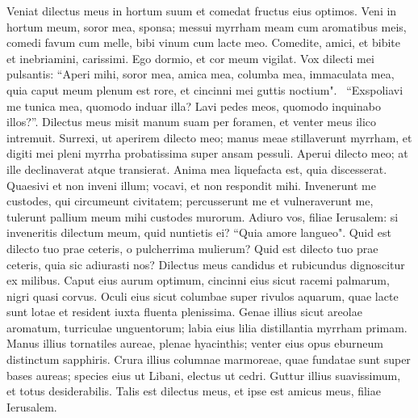 \begin{biblechapter}  
\verse Veniat dilectus meus in hortum suum et comedat fructus eius optimos. Veni in hortum meum, soror mea, sponsa; messui myrrham meam cum aromatibus meis, comedi favum cum melle, bibi vinum cum lacte meo. Comedite, amici, et bibite et inebriamini, carissimi. 
\verse Ego dormio, et cor meum vigilat. Vox dilecti mei pulsantis: “Aperi mihi, soror mea, amica mea, columba mea, immaculata mea, quia caput meum plenum est rore, et cincinni mei guttis noctium".  
\verse “Exspoliavi me tunica mea, quomodo induar illa? Lavi pedes meos, quomodo inquinabo illos?”. 
\verse Dilectus meus misit manum suam per foramen, et venter meus ilico intremuit. 
\verse Surrexi, ut aperirem dilecto meo; manus meae stillaverunt myrrham, et digiti mei pleni myrrha probatissima super ansam pessuli. 
\verse Aperui dilecto meo; at ille declinaverat atque transierat. Anima mea liquefacta est, quia discesserat. Quaesivi et non inveni illum; vocavi, et non respondit mihi. 
\verse Invenerunt me custodes, qui circumeunt civitatem; percusserunt me et vulneraverunt me, tulerunt pallium meum mihi custodes murorum. 
\verse Adiuro vos, filiae Ierusalem: si inveneritis dilectum meum, quid nuntietis ei? “Quia amore langueo". 
\verse Quid est dilecto tuo prae ceteris, o pulcherrima mulierum? Quid est dilecto tuo prae ceteris, quia sic adiurasti nos? 
\verse Dilectus meus candidus et rubicundus dignoscitur ex milibus. 
\verse Caput eius aurum optimum, cincinni eius sicut racemi palmarum, nigri quasi corvus. 
\verse Oculi eius sicut columbae super rivulos aquarum, quae lacte sunt lotae et resident iuxta fluenta plenissima. 
\verse Genae illius sicut areolae aromatum, turriculae unguentorum; labia eius lilia distillantia myrrham primam. 
\verse Manus illius tornatiles aureae, plenae hyacinthis; venter eius opus eburneum distinctum sapphiris. 
\verse Crura illius columnae marmoreae, quae fundatae sunt super bases aureas; species eius ut Libani, electus ut cedri. 
\verse Guttur illius suavissimum, et totus desiderabilis. Talis est dilectus meus, et ipse est amicus meus, filiae Ierusalem. 
\end{biblechapter}

